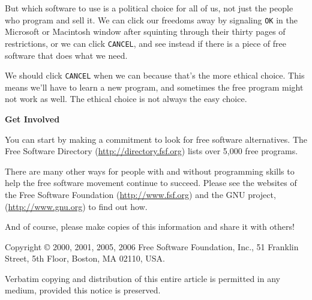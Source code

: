 \documentclass[twoside,12pt]{article}
\begin{document}
But which software to use is a political choice for all of us, not just the
people who program and sell it. We can click our freedoms away by signaling
{\tt OK} in the Microsoft or Macintosh window after squinting through their
thirty pages of restrictions, or we can click {\tt CANCEL}, and see instead if
there is a piece of free software that does what we need.

We should click {\tt CANCEL} when we can because that's the more ethical choice.
This means we'll have to learn a new program, and sometimes the free program
might not work as well. The ethical choice is not always the easy choice.

\begin{center}
{\Large\bf Get Involved}
\end{center}

You can start by making a commitment to look for free software alternatives.
The Free Software Directory (\url{http://directory.fsf.org}) lists over 5,000 free
programs.

There are many other ways for people with and without programming skills to
help the free software movement continue to succeed. Please see the websites of
the Free Software Foundation (\url{http://www.fsf.org}) and the GNU project,
(\url{http://www.gnu.org}) to find out how.

And of course, please make copies of this information and share it with
others!

\vspace{0.3in}

{\small

\noindent Copyright \copyright\/ 2000, 2001, 2005, 2006 Free Software Foundation, Inc., 51
Franklin Street, 5th Floor, Boston, MA 02110, USA.

Verbatim copying and distribution of this entire article is permitted
in any medium, provided this notice is preserved.
}
\end{document}
